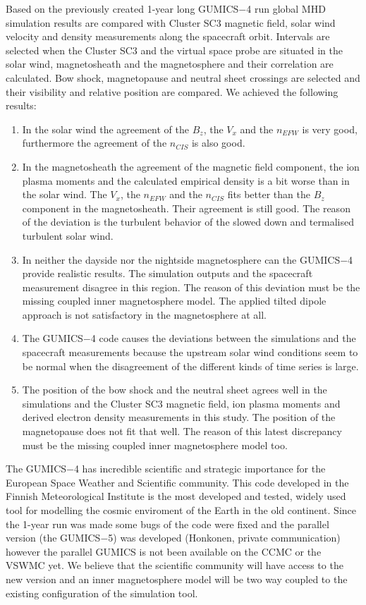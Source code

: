 \documentclass[linenumbers,draft]{agujournal}
\begin{document}
Based on the previously created 1-year long GUMICS$-$4 run global MHD simulation results are compared with Cluster SC3 magnetic field, solar wind velocity and density measurements along the spacecraft orbit. Intervals are selected when the Cluster SC3 and the virtual space probe are situated in the solar wind, magnetosheath and the magnetosphere and their correlation are calculated. Bow shock, magnetopause and neutral sheet crossings are selected and their visibility and relative position are compared. We achieved the following results:
\begin{enumerate}
\item In the solar wind the agreement of the $B_{z}$, the $V_{x}$ and the $n_{EFW}$ is very good, furthermore the agreement of the $n_{CIS}$ is also good.
\item In the magnetosheath the agreement of the magnetic field component, the ion plasma moments and the calculated empirical density is a bit worse than in the solar wind. The $V_{x}$, the $n_{EFW}$ and the $n_{CIS}$ fits better than the $B_{z}$ component in the magnetosheath. Their agreement is still good. The reason of the deviation is the turbulent behavior of the slowed down and termalised turbulent solar wind.
\item In neither the dayside nor the nightside magnetosphere can the GUMICS$-$4 provide realistic results. The simulation outputs and the spacecraft measurement disagree in this region. The reason of this deviation must be the missing coupled inner magnetosphere model. The applied tilted dipole approach is not satisfactory in the magnetosphere at all. 
\item The GUMICS$-$4 code causes the deviations between the simulations and the spacecraft measurements because the upstream solar wind conditions seem to be normal when the disagreement of the different kinds of time series is large.
\item The position of the bow shock and the neutral sheet agrees well in the simulations and the Cluster SC3 magnetic field, ion plasma moments and derived electron density measurements in this study. The position of the magnetopause does not fit that well. The reason of this latest discrepancy must be the missing coupled inner magnetosphere model too.
\end{enumerate}
The GUMICS$-$4 has incredible scientific and strategic importance for the European Space Weather and Scientific community. This code developed in the Finnish Meteorological Institute is the most developed and tested, widely used tool for modelling the cosmic enviroment of the Earth in the old continent. Since the 1-year run was made some bugs of the code were fixed and the parallel version (the GUMICS$-$5) was developed (Honkonen, private communication) however the parallel GUMICS is not been available on the CCMC or the VSWMC yet. We believe that the scientific community will have access to the new version and an inner magnetosphere model will be two way coupled to the existing configuration of the simulation tool.
\end{document}
